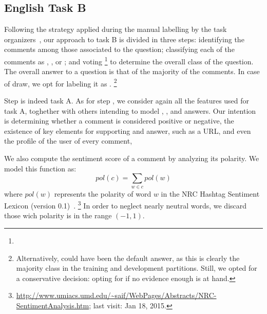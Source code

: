 
\subsection{English Task B}
\label{sub:app_enB}

Following the strategy applied during the manual labelling by the task 
organizers~, our approach to task B is divided in three steps:
\Ni identifying the \good comments among those associated to the question;
\Nii classifying each of the \good comments as \yes, \no, or \unsure; and 
\Niii voting%
\footnote{} to determine 
the overall class of the question. The overall answer to a question is that of 
the majority of the comments. In case of draw, we opt for labeling it as 
\unsure.%
\footnote{Alternatively, \yes could have been the default answer, as this is 
clearly the majority class in the training and development partitions. Still, 
we opted for a conservative decision: opting for \unsure if no evidence enough 
is at hand.}

Step \Ni is indeed task A. As for step \Nii, we consider again all the 
features used  for task A, toghether with others intending to model \yes, 
\no, and \unsure answers. Our intention is determining whether a comment is 
considered positive or negative, the existence of key elements for supporting 
and answer, such as a URL, and even the profile of the user of every comment, 

We also compute the sentiment score of a comment by analyzing its polarity. We 
model this function as:
\begin{equation}
pol(c) = \sum_{w\in c} pol(w) 
\end{equation}
%
where $pol(w)$ represents the polarity of word $w$ in the NRC Hashtag Sentiment 
Lexicon (version 0.1)~\cite{MohammadKZ2013}.%
\footnote{\url{
http://www.umiacs.umd.edu/~saif/WebPages/Abstracts/NRC-SentimentAnalysis.htm}; 
last visit: Jan 18, 2015.}
In order to neglect nearly 
neutral words, we discard those 
wich polarity is in the range $(-1,1)$. 


